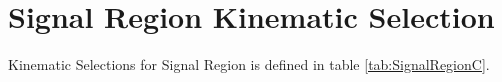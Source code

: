 






\section{Signal Region Kinematic Selection}
\label{sec:SR:Selections}

\indent Kinematic Selections for Signal Region is defined in table \ref{tab:SignalRegionC}.\\

